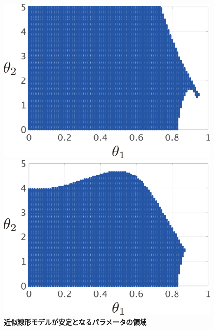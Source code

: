 \documentclass[tombow,dvipdfmx]{corona-a5-1.1}
\begin{document}
\begin{figure}[t!]
{\begin{minipage}{0.49\linewidth}
    \medskip
  \end{minipage}
}
  \centering
  {
  \begin{minipage}{0.49\linewidth}
      \centering
    \includegraphics[width = 0.90\linewidth]{figs/Y0.01D1}
    \medskip
  \end{minipage}
  \begin{minipage}{0.49\linewidth}
    \centering
    \includegraphics[width = 0.90\linewidth]{figs/Y0.01D0.01}
    \medskip
  \end{minipage}
}
 \caption{\textbf{近似線形モデルが安定となるパラメータの領域}}
 \label{fig:stacheck}
\medskip
\end{figure}
\end{document}
